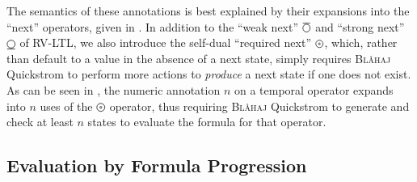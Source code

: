 \documentclass[sigplan,nonacm,10pt]{acmart}
\makeatletter
\newcommand{\Quickstrom}[0]{%
  \if@ACM@anonymous%
  \textsc{Bl\aa{}haj}%
  \else%
  Quickstrom%
  \fi\xspace}
\newcommand{\SNext}{\operatorname{%
  \tikz[baseline]{
    \draw[line width=.12ex]
      (0,.6ex) circle (.8ex);
      \draw[line width=.12ex] (-0.8ex,-0.4ex) -- (0.8ex,-0.4ex);
  }}}{}
\newcommand{\WNext}{\operatorname{%
  \tikz[baseline]{
    \draw[line width=.12ex]
      (0,.6ex) circle (.8ex);
      \draw[line width=.12ex] (-0.8ex,1.6ex) -- (0.8ex,1.6ex);
  }}}{}
\newcommand{\DNext}{\operatorname{%
  \tikz[baseline]{
    \draw[line width=.12ex]
      (0,.6ex) circle (.8ex);
    \draw[line width=.12ex]
      (0,.6ex) circle (.2ex);
  }}}{}
\makeatother
\begin{document}
The semantics of these annotations is best explained by their expansions into the ``next'' operators, given in . In addition to the ``weak next'' $\WNext$ and ``strong next'' $\SNext$ of RV-LTL, we also introduce the self-dual ``required next'' $\DNext$, which, rather
than default to a value in the absence of a next state, simply requires \Quickstrom to perform more actions to \emph{produce} a next state if one does not exist. As can be seen in , the numeric annotation $n$ on a temporal operator expands into $n$ uses of the $\DNext$ operator,
thus requiring \Quickstrom to generate and check at least $n$ states to evaluate the formula for that operator.

\subsection{Evaluation by Formula Progression}
\end{document}

